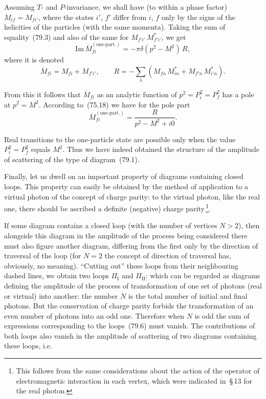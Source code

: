 Assuming $T$- and $P$-invariance, we shall have (to within a phase factor) $M_{if} = M_{fi'}$, where the states $i'$, $f'$ differ from $i$, $f$ only by the signs of the helicities of the particles (with the same momenta). Taking the sum of equality~(79.3) and also of the same for $M_{f'i'}\,M^*_{f'i'}$, we get
\begin{equation}
\mathrm{Im}\,\overline{M}_{fi}^{(\text{one-part.})} = -\pi\delta(p^2 - M^2)\,R,
\tag{79.4}
\end{equation}
where it is denoted
\[
\overline{M}_{fi} = M_{fi} + M_{f'i'},\qquad R = -\sum_\lambda(M_{fn}\,M^*_{in} + M_{f'n}\,M^*_{i'n}).
\]

From this it follows that $\overline{M}_{fi}$ as an analytic function of $p^2 = P_i^2 = P_f^2$ has a pole at $p^2 = M^2$. According to~(75.18) we have for the pole part
\begin{equation}
\overline{M}_{fi}^{(\text{one-part.})} = \frac{R}{p^2 - M^2 + i0}.
\tag{79.5}
\end{equation}

Real transitions to the one-particle state are possible only when the value $P_i^2 = P_f^2$ equals $M^2$. Thus we have indeed obtained the structure of the amplitude of scattering of the type of diagram~(79.1).

Finally, let us dwell on an important property of diagrams containing closed loops. This property can easily be obtained by the method of application to a virtual photon of the concept of charge parity: to the virtual photon, like the real one, there should be ascribed a definite (negative) charge parity\,\footnote{This follows from the same considerations about the action of the operator of electromagnetic interaction in each vertex, which were indicated in~\S\,13 for the real photon.}.

If some diagram contains a closed loop (with the number of vertices $N > 2$), then alongside this diagram in the amplitude of the process being considered there must also figure another diagram, differing from the first only by the direction of traversal of the loop (for $N = 2$ the concept of direction of traversal has, obviously, no meaning). ``Cutting out'' these loops from their neighbouring dashed lines, we obtain two loops $\Pi_\mathrm{I}$ and $\Pi_\mathrm{II}$:
which can be regarded as diagrams defining the amplitude of the process of transformation of one set of photons (real or virtual) into another: the number $N$ is the total number of initial and final photons. But the conservation of charge parity forbids the transformation of an even number of photons into an odd one. Therefore when $N$ is odd the sum of expressions corresponding to the loops~(79.6) must vanish. The contributions of both loops also vanish in the amplitude of scattering of two diagrams containing these loops, i.e.

